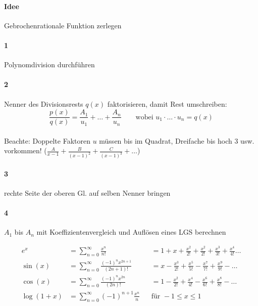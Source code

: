 \documentclass[a4paper]{article}
\begin{document}
\begin{appendix}
\begin{fmerke}[Partialbruchzerlegung]
		\paragraph{Idee} Gebrochenrationale Funktion zerlegen
		\vspace{-3mm}
		\paragraph{1} Polynomdivision durchführen
			\vspace{-3.5mm}
		\paragraph{2} Nenner des Divisionsrests $q(x)$ faktorisieren, damit Rest umschreiben:
				\vspace{-2mm}
			$$\frac{p(x)}{q(x)} = \frac{A_1}{u_1} + \ldots + \frac{A_n}{u_n} \qquad \text{wobei } u_1 \cdot \ldots \cdot u_n = q(x)$$\\[-3.8mm]
			Beachte: Doppelte Faktoren $u$ müssen bis im Quadrat, Dreifache bis hoch 3 usw. vorkommen! ($\frac{A}{x-1} + \frac{B}{(x-1)^2} + \frac{C}{(x-1)^3} + \ldots$)
			\vspace{-3.5mm}
		\paragraph{3} rechte Seite der oberen Gl. auf selben Nenner bringen
			\vspace{-3.5mm}
		\paragraph{4} $A_1$ bis $A_n$ mit Koeffizientenvergleich und Auflösen eines LGS berechnen
	\end{fmerke}
	
	\begin{fmerke}
		\begin{align*}
			e^x &= \sum_{n=0}^\infty		\frac{x^n}{n!}					&&= 1+x + \frac{x^2}{2!} + \frac{x^2}{2!} +  \frac{x^3}{3!} +  \frac{x^4}{4!}\ldots \\
			\sin(x)&= \sum_{n=0}^\infty 	\frac{(-1)^n x^{2n+1}}{(2n+1)!} &&= x - \frac{x^3}{2!} + \frac{x^5}{5!} -  \frac{x^7}{7!} +  \frac{x^9}{9!}-\ldots \\
			\cos(x) &= \sum_{n=0}^\infty	\frac{(-1)^n x^{2n}}{(2n)!}		&&= 1- \frac{x^2}{2!} + \frac{x^4}{4!} -  \frac{x^6}{6!} +  \frac{x^8}{8!}-\ldots\\
			\log(1+x) &= \sum_{n=0}^\infty	(-1)^{n+1}\frac{x^n}{n}		    &&\text{für } -1 \leq x \leq 1
		\end{align*}


\end{fmerke}
\end{appendix}
\end{document}
